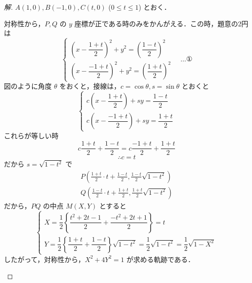 \documentclass[../main.tex]{subfiles}
\begin{document}
\begin{proof}[解]
  $A(1,0), B(-1,0), C(t,0)$ ($0 \le t \le 1$) とおく．

  対称性から，$P, Q$ の $y$ 座標が正である時のみをかんがえる．この時，題意の2円は
  \[
    \begin{cases}
      \left(x - \dfrac{1+t}{2}\right)^2 + y^2 = \left(\dfrac{1-t}{2}\right)^2 \\[8pt]
      \left(x - \dfrac{-1+t}{2}\right)^2 + y^2 = \left(\dfrac{1+t}{2}\right)^2
    \end{cases}
    \quad \dots \text{①}
  \]
  図のように角度 $\theta$ をおくと，接線は，$c = \cos\theta, s = \sin\theta$ とおくと
  \[
    \begin{cases}
      c\left(x - \dfrac{1+t}{2}\right) + sy = \dfrac{1-t}{2} \\[8pt]
      c\left(x - \dfrac{-1+t}{2}\right) + sy = \dfrac{1+t}{2}
    \end{cases}
  \]
  これらが等しい時
  \[
    c \frac{1+t}{2} + \frac{1-t}{2} = c \frac{-1+t}{2} + \frac{1+t}{2}
  \]
  \[
    \therefore c = t
  \]
  だから $s = \sqrt{1-t^2}$ で
  \begin{align*}
    P\left(\frac{1+t}{2} \cdot t + \frac{1-t}{2}, \frac{1-t}{2}\sqrt{1-t^2}\right) \\
    Q\left(\frac{1-t}{2} \cdot t + \frac{1+t}{2}, \frac{1+t}{2}\sqrt{1-t^2}\right)
  \end{align*}
  だから，$PQ$ の中点 $M(X,Y)$ とすると
  \[
    \begin{cases}
      X = \dfrac{1}{2}\left\{\dfrac{t^2+2t-1}{2} + \dfrac{-t^2+2t+1}{2}\right\} = t \\[8pt]
      Y = \dfrac{1}{2}\left\{\dfrac{1+t}{2} + \dfrac{1-t}{2}\right\}\sqrt{1-t^2} = \dfrac{1}{2}\sqrt{1-t^2} = \dfrac{1}{2}\sqrt{1-X^2}
    \end{cases}
  \]
  したがって，対称性から，$X^2 + 4Y^2 = 1$ が求める軌跡である．

  \begin{center}
\end{center}
\end{proof}
\end{document}
